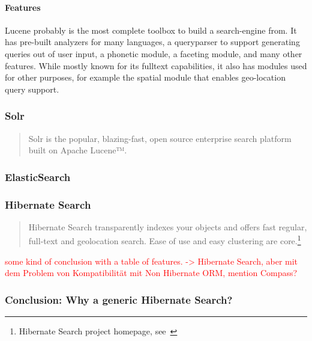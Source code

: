 \paragraph{Features}
Lucene probably is the most complete toolbox to build a search-engine from. It has pre-built analyzers for many languages, a queryparser to support generating queries out of user input, a phonetic module, a faceting module, and many other features. While mostly known for its fulltext capabilities, it also has modules used for other purposes, for example the spatial module that enables geo-location query support.

\subsubsection{Solr}

\begin{quote}
	Solr is the popular, blazing-fast, open source enterprise search platform built on Apache Lucene™.
\end{quote}

\subsubsection{ElasticSearch}

\subsubsection{Hibernate Search}

\begin{quote}
Hibernate Search transparently indexes your objects and offers fast regular, full-text and geolocation search. Ease of use and easy clustering are core.\footnote{Hibernate Search project homepage, see~\cite{hibernate_search_homepage}}
\end{quote}

\textcolor{red}{some kind of conclusion with a table of features. -> Hibernate Search, aber mit dem Problem von Kompatibilität mit Non Hibernate ORM, mention Compass?}

\subsubsection{Conclusion: Why a generic Hibernate Search?}

\pagebreak